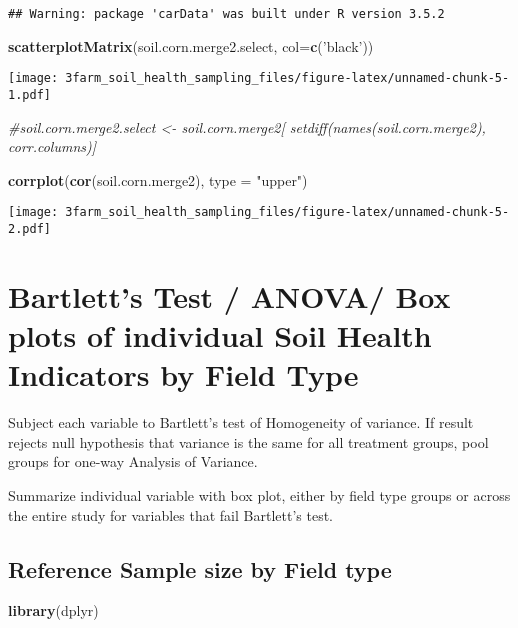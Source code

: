 \documentclass[]{article}
\newenvironment{Shaded}{\begin{snugshade}}{\end{snugshade}}
\newcommand{\KeywordTok}[1]{\textcolor[rgb]{0.13,0.29,0.53}{\textbf{#1}}}
\newcommand{\DataTypeTok}[1]{\textcolor[rgb]{0.13,0.29,0.53}{#1}}
\newcommand{\StringTok}[1]{\textcolor[rgb]{0.31,0.60,0.02}{#1}}
\newcommand{\CommentTok}[1]{\textcolor[rgb]{0.56,0.35,0.01}{\textit{#1}}}
\newcommand{\NormalTok}[1]{#1}
\begin{document}
\begin{verbatim}
## Warning: package 'carData' was built under R version 3.5.2
\end{verbatim}

\begin{Shaded}
\begin{Highlighting}[]
\KeywordTok{scatterplotMatrix}\NormalTok{(soil.corn.merge2.select, }\DataTypeTok{col=}\KeywordTok{c}\NormalTok{(}\StringTok{'black'}\NormalTok{))}
\end{Highlighting}
\end{Shaded}

\texttt{[image: 3farm\_soil\_health\_sampling\_files/figure-latex/unnamed-chunk-5-1.pdf]}

\begin{Shaded}
\begin{Highlighting}[]
\CommentTok{#soil.corn.merge2.select <- soil.corn.merge2[ setdiff(names(soil.corn.merge2), corr.columns)]}

\KeywordTok{corrplot}\NormalTok{(}\KeywordTok{cor}\NormalTok{(soil.corn.merge2), }\DataTypeTok{type =} \StringTok{"upper"}\NormalTok{)}
\end{Highlighting}
\end{Shaded}

\texttt{[image: 3farm\_soil\_health\_sampling\_files/figure-latex/unnamed-chunk-5-2.pdf]}

\section{Bartlett's Test / ANOVA/ Box plots of individual Soil Health
Indicators by Field
Type}\label{bartletts-test-anova-box-plots-of-individual-soil-health-indicators-by-field-type}

Subject each variable to Bartlett's test of Homogeneity of variance. If
result rejects null hypothesis that variance is the same for all
treatment groups, pool groups for one-way Analysis of Variance.

Summarize individual variable with box plot, either by field type groups
or across the entire study for variables that fail Bartlett's test.

\subsection{Reference Sample size by Field
type}\label{reference-sample-size-by-field-type}

\begin{Shaded}
\begin{Highlighting}[]
\KeywordTok{library}\NormalTok{(dplyr)}
\end{Highlighting}
\end{Shaded}
\end{document}

